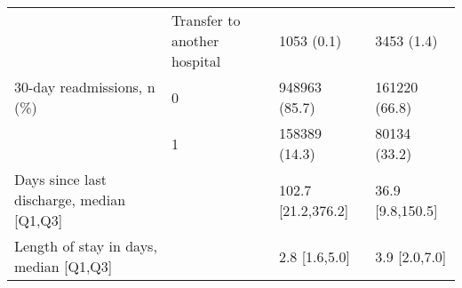 \begin{tabular}{llll}
                                       & Transfer to another hospital &               1053 (0.1) &        3453 (1.4) \\
30-day readmissions, n (\%) & 0 &            948963 (85.7) &     161220 (66.8) \\
                                       & 1 &            158389 (14.3) &      80134 (33.2) \\
Days since last discharge, median [Q1,Q3] &   &       102.7 [21.2,376.2] &  36.9 [9.8,150.5] \\
Length of stay in days, median [Q1,Q3] &   &            2.8 [1.6,5.0] &     3.9 [2.0,7.0] \\
\bottomrule
\end{tabular}
